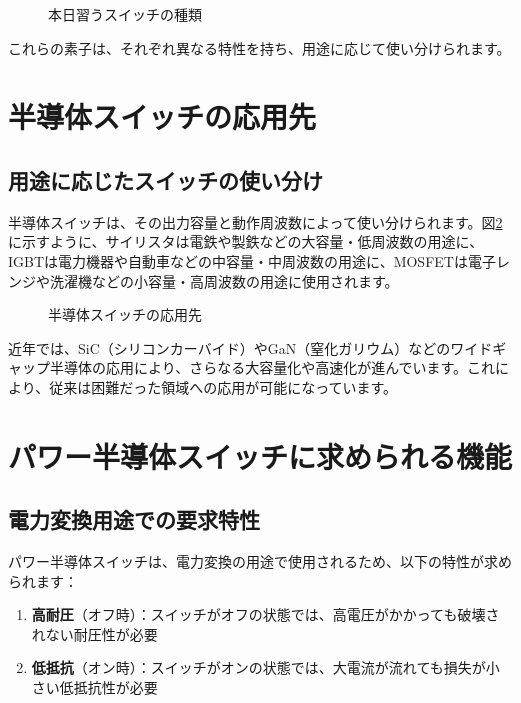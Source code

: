 \begin{figure}[H]
\centering
{}
\caption{本日習うスイッチの種類}
\label{fig:switch_types}
\end{figure}

これらの素子は、それぞれ異なる特性を持ち、用途に応じて使い分けられます。

\section{半導体スイッチの応用先}

\subsection{用途に応じたスイッチの使い分け}

半導体スイッチは、その出力容量と動作周波数によって使い分けられます。図\ref{fig:applications}に示すように、サイリスタは電鉄や製鉄などの大容量・低周波数の用途に、IGBTは電力機器や自動車などの中容量・中周波数の用途に、MOSFETは電子レンジや洗濯機などの小容量・高周波数の用途に使用されます。

\begin{figure}[H]
\centering
{}
\caption{半導体スイッチの応用先}
\label{fig:applications}
\end{figure}

近年では、SiC（シリコンカーバイド）やGaN（窒化ガリウム）などのワイドギャップ半導体の応用により、さらなる大容量化や高速化が進んでいます。これにより、従来は困難だった領域への応用が可能になっています。

\section{パワー半導体スイッチに求められる機能}

\subsection{電力変換用途での要求特性}

パワー半導体スイッチは、電力変換の用途で使用されるため、以下の特性が求められます：

\begin{enumerate}
\item \textbf{高耐圧}（オフ時）：スイッチがオフの状態では、高電圧がかかっても破壊されない耐圧性が必要
\item \textbf{低抵抗}（オン時）：スイッチがオンの状態では、大電流が流れても損失が小さい低抵抗性が必要
\end{enumerate}

